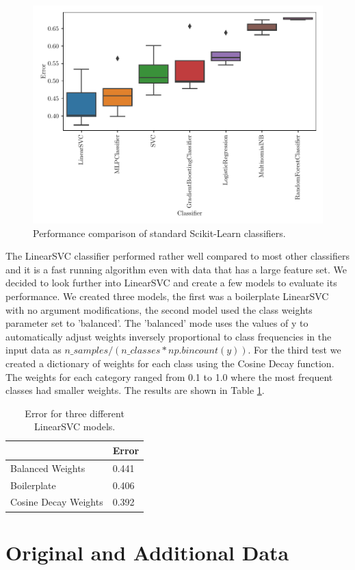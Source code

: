 \begin{figure}[ht]
  \centering
  \includegraphics[width=\textwidth]{../img/plot_explore_classifiers.pdf}
  \caption{Performance comparison of standard Scikit-Learn classifiers.}
  \label{fig:explore_classifiers}
\end{figure}

The LinearSVC classifier performed rather well compared to most other classifiers and it is a fast running algorithm even with data that has a large feature set. We decided to look further into LinearSVC and create a few models to evaluate its performance. We created three models, the first was a boilerplate LinearSVC with no argument modifications, the second model used the class weights parameter set to 'balanced'. The 'balanced' mode uses the values of y to automatically adjust weights inversely proportional to class frequencies in the input data as $n\_samples / (n\_classes * np.bincount(y))$. For the third test we created a dictionary of weights for each class using the Cosine Decay function. The weights for each category ranged from 0.1 to 1.0 where the most frequent classes had smaller weights. The results are shown in Table \ref{tab:lsvc_models}.


\begin{table}[h]
\centering
\begin{tabular}{|l|l|}
\hline
{} & \textbf{Error} \\
\hline
Balanced Weights & 0.441 \\
\hline
Boilerplate & 0.406 \\
\hline
Cosine Decay Weights & 0.392 \\
\hline
\end{tabular}
\caption{Error for three different LinearSVC models.}
\label{tab:lsvc_models}
\end{table}


\section{Original and Additional Data}